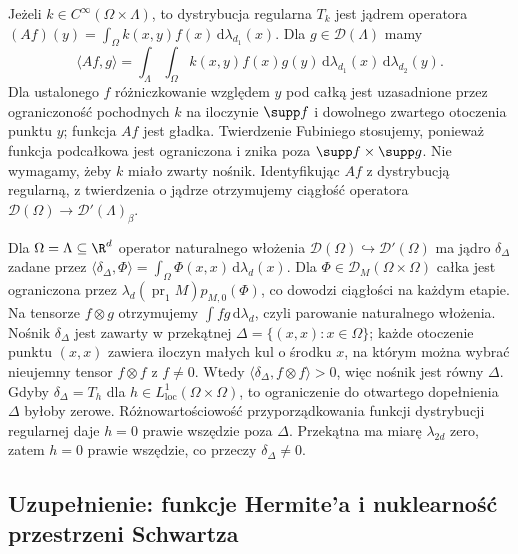 \begin{przyklad}
\label{ex:smooth-kernel23}
Jeżeli $k\in C^\infty(\Omega\times\Lambda)$, to dystrybucja
regularna $T_k$ jest jądrem operatora
$(Af)(y)=\int_\Omega k(x,y)f(x)\,\mathrm d\lambda_{d_1}(x)$.
Dla $g\in\mathcal D(\Lambda)$ mamy
\[
\langle Af,g\rangle
=\int_{\Lambda}\int_{\Omega}k(x,y)f(x)g(y)
\,\mathrm d\lambda_{d_1}(x)\,\mathrm d\lambda_{d_2}(y).
\]
Dla ustalonego $f$ różniczkowanie względem $y$
pod całką jest uzasadnione przez ograniczoność pochodnych
$k$ na iloczynie $\supp f$ i dowolnego zwartego
otoczenia punktu $y$; funkcja $Af$ jest gładka.
Twierdzenie Fubiniego stosujemy, ponieważ funkcja
podcałkowa jest ograniczona i znika poza
$\supp f\times\supp g$. Nie wymagamy, żeby $k$
miało zwarty nośnik. Identyfikując $Af$ z dystrybucją
regularną, z twierdzenia o jądrze otrzymujemy
ciągłość operatora $\mathcal D(\Omega)\to
\mathcal D'(\Lambda)_\beta$.
\end{przyklad}

\begin{przyklad}
\label{ex:diagonal-kernel23}
Dla $\Omega=\Lambda\subseteq\R^d$ operator naturalnego
włożenia $\mathcal D(\Omega)\hookrightarrow\mathcal D'(\Omega)$
ma jądro $\delta_\Delta$ zadane przez
$\langle\delta_\Delta,\Phi\rangle
=\int_\Omega\Phi(x,x)\,\mathrm d\lambda_d(x)$.
Dla $\Phi\in\mathcal D_M(\Omega\times\Omega)$
całka jest ograniczona przez
$\lambda_d(\operatorname{pr}_1 M)p_{M,0}(\Phi)$,
co dowodzi ciągłości na każdym etapie.
Na tensorze $f\otimes g$ otrzymujemy $\int fg\,
\mathrm d\lambda_d$, czyli parowanie naturalnego
włożenia. Nośnik $\delta_\Delta$ jest zawarty
w przekątnej $\Delta=\{(x,x):x\in\Omega\}$;
każde otoczenie punktu $(x,x)$ zawiera iloczyn
małych kul o środku $x$, na którym można wybrać
nieujemny tensor $f\otimes f$ z $f\ne0$.
Wtedy $\langle\delta_\Delta,f\otimes f\rangle>0$,
więc nośnik jest równy $\Delta$.
Gdyby $\delta_\Delta=T_h$ dla
$h\in L^1_{\mathrm{loc}}(\Omega\times\Omega)$,
to ograniczenie do otwartego dopełnienia $\Delta$
byłoby zerowe. Różnowartościowość przyporządkowania
funkcji dystrybucji regularnej daje $h=0$ prawie
wszędzie poza $\Delta$. Przekątna ma miarę
$\lambda_{2d}$ zero, zatem $h=0$ prawie wszędzie,
co przeczy $\delta_\Delta\ne0$.
\end{przyklad}

\subsection{Uzupełnienie: funkcje Hermite'a i nuklearność przestrzeni Schwartza}
\label{sec:hermite-supp23}

